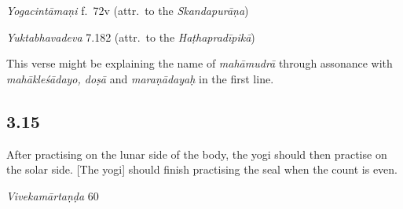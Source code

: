 \begin{ekdosis}
\begin{testimonia}[hp03_014]
\emph{Yogacintāmaṇi} f.~72v (attr.~to the \emph{Skandapurāṇa})
\begin{versinnote}
\end{versinnote}

\emph{Yuktabhavadeva} 7.182 (attr.~to the \emph{Haṭhapradīpikā})
\begin{versinnote}
\end{versinnote}
\end{testimonia}

\begin{philcomm}[hp03_014]
This verse might be explaining the name of \emph{mahāmudrā} through assonance with \emph{mahākleśādayo, doṣā} and \emph{maraṇādayaḥ} in the first line.
\end{philcomm}

\subsection*{3.15}
\begin{translation}[hp03_015]
After practising on the lunar side of the body, the yogi should then practise on the solar side. [The yogi] should finish practising the seal when the count is even.
\end{translation}

\begin{sources}[hp03_015]
\emph{Vivekamārtaṇḍa} 60
\begin{versinnote}
\end{versinnote}
\end{sources}


\end{ekdosis}
